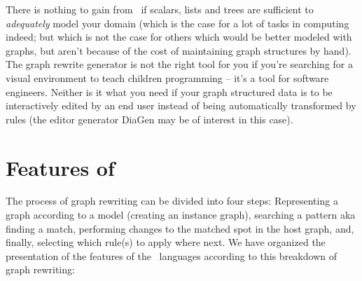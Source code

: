 There is nothing to gain from \GrG\ if scalars, lists and trees are sufficient to \emph{adequately} model your domain 
(which is the case for a lot of tasks in computing indeed; 
but which is not the case for others which would be better modeled with graphs, but aren't because of the cost of maintaining graph structures by hand).
The graph rewrite generator is not the right tool for you if you're searching for a visual environment to teach children programming -- it's a tool for software engineers.
Neither is it what you need if your graph structured data is to be interactively edited by an end user instead of being automatically transformed by rules (the editor generator DiaGen\cite{diagen} may be of interest in this case).


\section{Features of \GrG}

The process of graph rewriting can be divided into four steps:
Representing a graph according to a model (creating an instance graph), 
searching a pattern aka finding a match, 
performing changes to the matched spot in the host graph, 
and, finally, selecting which rule(s) to apply where next.
We have organized the presentation of the features of the \GrG\ languages according to this breakdown of graph rewriting:

